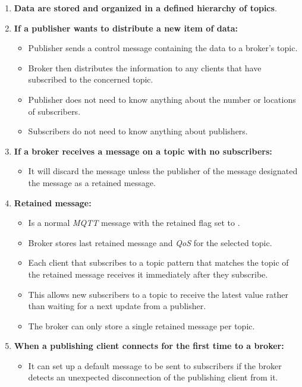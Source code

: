 \documentclass[report.tex]{subfiles}
\begin{document}
\begin{enumerate}
\item \textbf{Data are stored and organized in a defined hierarchy of topics}.
\item \textbf{If a publisher wants to distribute a new item of data:}
\begin{itemize}
\item Publisher sends a control message containing the data to a broker's topic.
\item Broker then distributes the information to any clients that have subscribed to the concerned topic.
\item Publisher does not need to know anything about the number or locations of subscribers.
\item Subscribers do not need to know anything about publishers.
\end{itemize}
\item \textbf{If a broker receives a message on a topic with no subscribers:}
\begin{itemize}
\item It will discard the message unless the publisher of the message designated the message as a retained message.
\end{itemize}
\item \textbf{Retained message:}
\begin{itemize}
\item Is a normal \textit{MQTT} message with the retained flag set to .
\item Broker stores last retained message and \textit{QoS} for the selected topic.
\item Each client that subscribes to a topic pattern that matches the topic of the retained message receives it immediately after they subscribe.
\item This allows new subscribers to a topic to receive the latest value rather than waiting for a next update from a publisher.
\item The broker can only store a single retained message per topic.
\end{itemize}
\item \textbf{When a publishing client connects for the first time to a broker:}
\begin{itemize}
\item It can set up a default message to be sent to subscribers if the broker detects an unexpected disconnection of the publishing client from it.
\end{itemize}

\end{enumerate}
\end{document}
